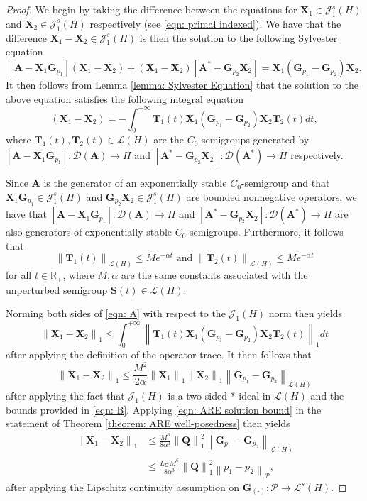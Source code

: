 \documentclass{amsart}
\newcommand{\sL}{\mathscr L}
\newcommand{\sJ}{\mathscr J}
\newcommand{\p}[1]{\left( {#1} \right)}
\newcommand{\norm}[1]{\left\| #1 \right\|}
\newcommand{\br}[1]{\left[ #1 \right]}
\newcommand{\sP}{\mathcal{P}}
\newcommand{\bA}{\mathbf A}
\newcommand{\bX}{\mathbf X}
\newcommand{\bQ}{\mathbf Q}
\newcommand{\bG}{\mathbf G}
\newcommand{\bS}{\mathbf S}
\newcommand{\bT}{\mathbf T}
\begin{document}
\begin{proof}
    We begin by taking the difference between the equations for $\bX_1 \in \sJ_1^s\p{H}$ and $\bX_2 \in \sJ_1^s(H)$ respectively (see \eqref{eqn: primal indexed}), We have that the difference $\bX_1 - \bX_2 \in \sJ_1^s\p{H}$ is then the solution to the following Sylvester equation
    $$
        \br{\bA - \bX_1 \bG_{p_1}}\p{\bX_1 - \bX_2} 
        + \p{\bX_1 - \bX_2} \br{\bA^* - \bG_{p_2}\bX_2} = \bX_1\p{\bG_{p_1} - \bG_{p_2}} \bX_2.
    $$
    It then follows from Lemma \ref{lemma: Sylvester Equation} that the solution to the above equation satisfies the following integral equation
    \begin{equation} \label{eqn: A}
        \p{\bX_1 - \bX_2} = -\int_0^{+\infty} \bT_1(t)\bX_1\p{\bG_{p_1} - \bG_{p_2}}\bX_2\bT_2(t)dt, 
    \end{equation}
    where $\bT_1(t), \bT_2(t) \in \sL\p{H}$ are the $C_0$-semigroups generated by $\br{\bA - \bX_1\bG_{p_1}} : \mathcal D\p{\bA} \rightarrow H$ and $\br{\bA^* - \bG_{p_2}\bX_2} : \mathcal D\p{\bA^*} \rightarrow H$ respectively. 
    
    Since $\bA$ is the generator of an exponentially stable $C_0$-semigroup and that $\bX_1\bG_{p_1} \in \sJ_1^s(H)$ and $\bG_{p_2}\bX_2 \in \sJ_1^s\p{H}$ are bounded nonnegative operators, we have that $\br{\bA - \bX_1\bG_{p_1}}: \mathcal D(\bA) \rightarrow H$ and $\br{\bA^*-\bG_{p_2}\bX_2} : \mathcal D(\bA^*) \rightarrow H$ are also generators of exponentially stable $C_0$-semigroups. Furthermore, it follows that
    \begin{equation} \label{eqn: B}
        \norm{\bT_1(t)}_{\sL\p{H}} \leq Me^{-\alpha t} \textrm{ and } \norm{\bT_2(t)}_{\sL\p{H}} \leq Me^{-\alpha t}
    \end{equation}
    for all $t \in \mathbb R_+$, where $M,\alpha$ are the same constants associated with the unperturbed semigroup $\bS(t) \in \sL(H)$. 

    Norming both sides of \eqref{eqn: A} with respect to the $\sJ_1\p{H}$ norm then yields
    $$
        \norm{\bX_1 - \bX_2}_{1} \leq  \int_0^{+\infty} \norm{\bT_1(t)\bX_1\p{\bG_{p_1} - \bG_{p_2}}\bX_2\bT_2(t)}_{1} dt
    $$
    after applying the definition of the operator trace. It then follows that
    $$
        \norm{\bX_1 - \bX_2}_{1} \leq \frac{M^2}{2\alpha} \norm{\bX_1}_{1} \norm{\bX_2}_{1}\norm{\bG_{p_1} - \bG_{p_2}}_{\sL(H)}
    $$
    after applying the fact that $\sJ_1(H)$ is a two-sided *-ideal in $\sL(H)$ and the bounds provided in \eqref{eqn: B}. Applying \eqref{eqn: ARE solution bound} in the statement of Theorem \ref{theorem: ARE well-posedness} then yields
    $$
    \begin{aligned}
        \norm{\bX_1 - \bX_2}_{1} 
        &\leq \frac{M^6}{8\alpha^3} \norm{\bQ}^2_{1} \norm{\bG_{p_1} - \bG_{p_2}}_{\sL\p{H}} \\
        &\leq \frac{L_{\bG}M^6}{8\alpha^3} \norm{\bQ}^2_{1} \norm{p_1 - p_2}_{\sP},
    \end{aligned}
    $$    
    after applying the Lipschitz continuity assumption on $\bG_{\p{\cdot}}: \sP \rightarrow \sL^s(H)$.
\end{proof}
\end{document}
